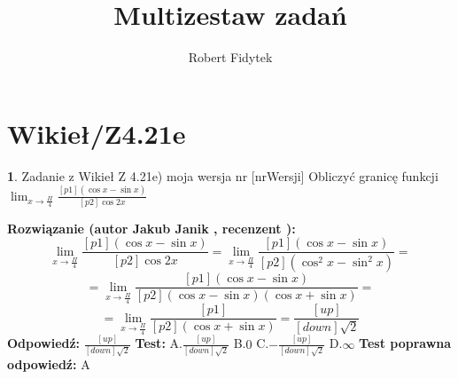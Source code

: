 \documentclass[12pt, a4paper]{article}
\title{Multizestaw zadań}
\author{Robert Fidytek}
\date{}
\theoremstyle{definition} %
\newtheorem{zad}{}
\newcommand{\kategoria}[1]{\section{#1}} %
\newcommand{\zadStart}[1]{\begin{zad}#1\newline} %
\newcommand{\zadStop}{\end{zad}}   %
\newcommand{\rozwStart}[2]{\noindent \textbf{Rozwiązanie (autor #1 , recenzent #2): }\newline} %
\newcommand{\odpStart}{\noindent \textbf{Odpowiedź:}\newline}    %
\newcommand{\odpStop}{\newline}                                             %
\newcommand{\testStart}{\noindent \textbf{Test:}\newline} %
\newcommand{\testStop}{\newline} %
\newcommand{\kluczStart}{\noindent \textbf{Test poprawna odpowiedź:}\newline} %
\newcommand{\kluczStop}{\newline} %
\begin{document}
\maketitle


\kategoria{Wikieł/Z4.21e}
\zadStart{Zadanie z Wikieł Z 4.21e) moja wersja nr [nrWersji]}
Obliczyć granicę funkcji $\lim_{x \to \frac{\Pi}{4}} \frac{[p1](\cos{x}-\sin{x})}{[p2]\cos{2x}}$
\zadStop
\rozwStart{Jakub Janik}{}
$$\lim_{x \to \frac{\Pi}{4}} \frac{[p1](\cos{x}-\sin{x})}{[p2]\cos{2x}}=\lim_{x \to \frac{\Pi}{4}} \frac{[p1](\cos{x}-\sin{x})}{[p2](\cos^2{x}-\sin^2{x})}=$$
$$=\lim_{x \to \frac{\Pi}{4}} \frac{[p1](\cos{x}-\sin{x})}{[p2](\cos{x}-\sin{x})(\cos{x}+\sin{x})}=$$
$$=\lim_{x \to \frac{\Pi}{4}} \frac{[p1]}{[p2](\cos{x}+\sin{x})}=\frac{[up]}{[down]\sqrt{2}}$$
\odpStart
$\frac{[up]}{[down]\sqrt{2}}$
\odpStop
\testStart
A.$\frac{[up]}{[down]\sqrt{2}}$
B.$0$
C.$-\frac{[up]}{[down]\sqrt{2}}$
D.$\infty$
\testStop
\kluczStart
A
\kluczStop
\end{document}
